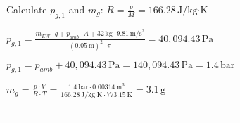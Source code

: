 Calculate \( p_{g,1} \) and \( m_g \):  
\( R = \frac{p}{M} = 166.28 \, \text{J/kg·K} \)  

\( p_{g,1} = \frac{m_{EW} \cdot g + p_{amb} \cdot A + 32 \, \text{kg} \cdot 9.81 \, \text{m/s}^2}{(0.05 \, \text{m})^2 \cdot \pi} = 40,094.43 \, \text{Pa} \)  

\( p_{g,1} = p_{amb} + 40,094.43 \, \text{Pa} = 140,094.43 \, \text{Pa} = 1.4 \, \text{bar} \)  

\( m_g = \frac{p \cdot V}{R \cdot T} = \frac{1.4 \, \text{bar} \cdot 0.00314 \, \text{m}^3}{166.28 \, \text{J/kg·K} \cdot 773.15 \, \text{K}} = 3.1 \, \text{g} \)  

---